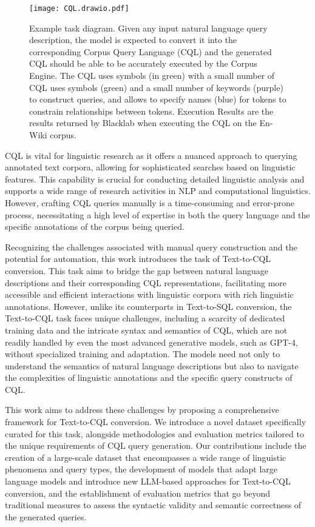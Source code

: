 \documentclass[11pt]{article}
\begin{document}
\begin{CJK*}{UTF8}{gbsn}
\begin{figure}[t]
    \centering
    \texttt{[image: CQL.drawio.pdf]}
    \caption{Example task diagram. Given any input natural language query description, the model is expected to convert it into the corresponding Corpus Query Language (CQL) and the generated CQL should be able to be accurately executed by the Corpus Engine. The CQL uses symbols (in green) with a small number of CQL uses symbols (green) and a small number of keywords (purple) to construct queries, and allows to specify names (blue) for tokens to constrain relationships between tokens. Execution Results are the results returned by Blacklab when executing the CQL on the En-Wiki corpus.}
    \label{fig:cql}
\end{figure}


CQL is vital for linguistic research as it offers a nuanced approach to querying annotated text corpora, allowing for sophisticated searches based on linguistic features. This capability is crucial for conducting detailed linguistic analysis and supports a wide range of research activities in NLP and computational linguistics. However, crafting CQL queries manually is a time-consuming and error-prone process, necessitating a high level of expertise in both the query language and the specific annotations of the corpus being queried.

Recognizing the challenges associated with manual query construction and the potential for automation, this work introduces the task of Text-to-CQL conversion. This task aims to bridge the gap between natural language descriptions and their corresponding CQL representations, facilitating more accessible and efficient interactions with linguistic corpora with rich linguistic annotations. However, unlike its counterparts in Text-to-SQL conversion, the Text-to-CQL task faces unique challenges, including a scarcity of dedicated training data and the intricate syntax and semantics of CQL, which are not readily handled by even the most advanced generative models, such as GPT-4, without specialized training and adaptation.
The models need not only to understand the semantics of natural language descriptions but also to navigate the complexities of linguistic annotations and the specific query constructs of CQL.

This work aims to address these challenges by proposing a comprehensive framework for Text-to-CQL conversion. We introduce a novel dataset specifically curated for this task, alongside methodologies and evaluation metrics tailored to the unique requirements of CQL query generation. Our contributions include the creation of a large-scale dataset that encompasses a wide range of linguistic phenomena and query types, the development of models that adapt large language models and introduce new LLM-based approaches for Text-to-CQL conversion, and the establishment of evaluation metrics that go beyond traditional measures to assess the syntactic validity and semantic correctness of the generated queries.


\end{CJK*}
\end{document}
